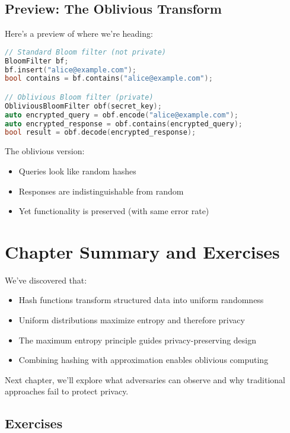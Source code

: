 \subsection{Preview: The Oblivious Transform}

Here's a preview of where we're heading:

\begin{lstlisting}[language=C++]
// Standard Bloom filter (not private)
BloomFilter bf;
bf.insert("alice@example.com");
bool contains = bf.contains("alice@example.com");

// Oblivious Bloom filter (private)
ObliviousBloomFilter obf(secret_key);
auto encrypted_query = obf.encode("alice@example.com");
auto encrypted_response = obf.contains(encrypted_query);
bool result = obf.decode(encrypted_response);
\end{lstlisting}

The oblivious version:
\begin{itemize}
    \item Queries look like random hashes
    \item Responses are indistinguishable from random
    \item Yet functionality is preserved (with same error rate)
\end{itemize}

\section{Chapter Summary and Exercises}

We've discovered that:
\begin{itemize}
    \item Hash functions transform structured data into uniform randomness
    \item Uniform distributions maximize entropy and therefore privacy
    \item The maximum entropy principle guides privacy-preserving design
    \item Combining hashing with approximation enables oblivious computing
\end{itemize}

Next chapter, we'll explore what adversaries can observe and why traditional approaches fail to protect privacy.

\subsection{Exercises}

